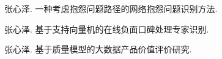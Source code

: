 
\begin{cventries}
\vspace{-1.5mm}
\cvpapers
{
    \begin{cvitems}
    \item {张心泽. 一种考虑抱怨问题路径的网络抱怨问题识别方法.}
    \item {张心泽. 基于支持向量机的在线负面口碑处理专家识别.}
    \item {张心泽. 基于质量模型的大数据产品价值评价研究.}
    \end{cvitems}
}

\end{cventries}